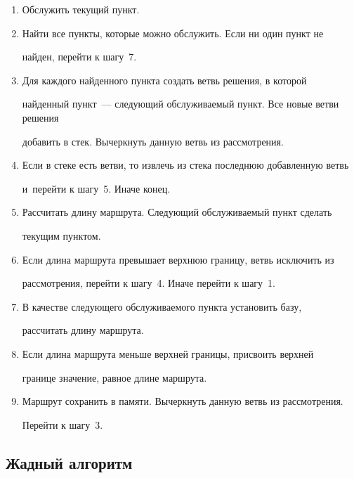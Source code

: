   \begin{enumerate}[1.]


  \item  Обслужить текущий пункт.


  \item Найти все пункты, которые можно обслужить. Если ни один пункт не 


найден, перейти к шагу~7.


  \item Для каждого найденного пункта создать ветвь решения, в которой 


найденный пункт~--- следующий обслуживаемый пункт. Все новые ветви решения 


добавить в стек. Вычеркнуть данную ветвь из рассмотрения.


\item  Если в стеке есть ветви, то извлечь из стека последнюю добавленную ветвь 


и~перейти к шагу~5. Иначе конец.


  \item  Рассчитать длину маршрута. Следующий обслуживаемый пункт сделать 


текущим пунктом.


  \item Если длина маршрута превышает верхнюю границу, ветвь исключить из 


рассмотрения, перейти к шагу~4. Иначе перейти к шагу~1. 


  \item  В качестве следующего обслуживаемого пункта установить базу, 


рассчитать длину маршрута.


  \item  Если длина маршрута меньше верхней границы, присвоить верхней 


границе значение, равное длине маршрута.


  \item Маршрут сохранить в памяти. Вычеркнуть данную ветвь из рассмотрения. 


Перейти к шагу~3. 


  \end{enumerate}


  


  \vspace*{-6pt}


  


\subsection{Жадный алгоритм}





